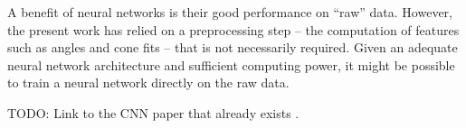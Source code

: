 A benefit of neural networks is their good performance on \enquote{raw} data.
However,
the present work has relied on a preprocessing step %
  – the computation of features such as angles and cone fits –
that is not necessarily required.
Given an adequate neural network architecture and sufficient computing power,
it might be possible to train a neural network directly on the raw data.

TODO: Link to the CNN paper that already exists \cite{minh2021gnn}.

